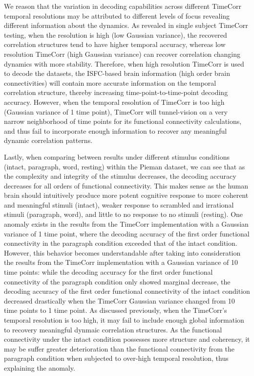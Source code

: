 \documentclass[11pt]{article}
\begin{document}
We reason that the variation in decoding capabilities across different TimeCorr temporal resolutions may be attributed to different levels of focus revealing different information about the dynamics. As revealed in single subject TimeCorr testing, when the resolution is high (low Gaussian variance), the recovered correlation structures tend to have higher temporal accuracy, whereas low resolution TimeCorr (high Gaussian variance) can recover correlation changing dynamics with more stability. Therefore, when high resolution TimeCorr is used to decode the datasets, the ISFC-based brain information (high order brain connectivities) will contain more accurate information on the temporal correlation structure, thereby increasing time-point-to-time-point decoding accuracy. However, when the temporal resolution of TimeCorr is too high (Gaussian variance of 1 time point), TimeCorr will tunnel-vision on a very narrow neighborhood of time points for its functional connectivity calculations, and thus fail to incorporate enough information to recover any meaningful dynamic correlation patterns.

Lastly, when comparing between results under different stimulus conditions (intact, paragraph, word, resting) within the Pieman dataset, we can see that as the complexity and integrity of the stimulus decreases, the decoding accuracy decreases for all orders of functional connectivity. This makes sense as the human brain should intuitively produce more potent cognitive response to more coherent and meaningful stimuli (intact), weaker response to scrambled and irrational stimuli (paragraph, word), and little to no response to no stimuli (resting). One anomaly exists in the results from the TimeCorr implementation with a Gaussian variance of 1 time point, where the decoding accuracy of the first order functional connectivity in the paragraph condition exceeded that of the intact condition. However, this behavior becomes understandable after taking into consideration the results from the TimeCorr implementation with a Gaussian variance of 10 time points: while the decoding accuracy for the first order functional connectivity of the paragraph condition only showed marginal decrease, the decoding accuracy of the first order functional connectivity of the intact condition decreased drastically when the TimeCorr Gaussian variance changed from 10 time points to 1 time point. As discussed previously, when the TimeCorr's temporal resolution is too high, it may fail to include enough global information to recovery meaningful dynmaic correlation structures. As the functional connectivity under the intact condition possesses more structure and coherency, it may be suffer greater deterioration than the functional connectivity from the paragraph condition when subjected to over-high temporal resolution, thus explaining the anomaly.
\end{document}

